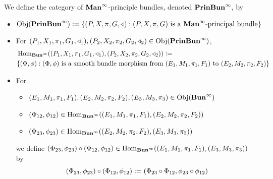\documentclass{book}
\begin{document}
\begin{ex}
	
\end{ex}






\begin{defn} 
	We define the category of $\operatorname*{\text{\textbf{Man}}^{\infty}}$-principle bundles, denoted $\operatorname*{\text{\textbf{PrinBun}}^{\infty}}$, by 
	\begin{itemize}
		\item $\operatorname{Obj}(\operatorname*{\text{\textbf{PrinBun}}^{\infty}}) \vcentcolon= \{(P, X, \pi, G, \triangleleft): (P, X, \pi, G) \text{ is a $\operatorname*{\text{\textbf{Man}}^{\infty}}$-principal bundle}\}$ 
		\item For $(P_1, X_1, \pi_1, G_1, \triangleleft_1), (P_2, X_2, \pi_2, G_2, \triangleleft_2) \in \operatorname{Obj}(\operatorname*{\text{\textbf{PrinBun}}^{\infty}})$, 
		\begin{align*}
			& \operatorname{Hom}_{\operatorname*{\text{\textbf{Bun}}^{\infty}}}((P_1, X_1, \pi_1, G_1, \triangleleft_1), (P_2, X_2, \pi_2, G_2, \triangleleft_2)) \vcentcolon= \\
			& \{(\Phi, \phi): (\Phi, \phi) \text{ is a smooth bundle morphism from $(E_1, M_1, \pi_1, F_1)$ to $(E_2, M_2, \pi_2, F_2)$} \}
		\end{align*}
		\item For 
		\begin{itemize}
			\item $(E_1, M_1, \pi_1, F_1), (E_2, M_2, \pi_2, F_2), (E_3, M_3, \pi_3) \in \operatorname{Obj}(\operatorname*{\text{\textbf{Bun}}^{\infty}})$ 
			\item $(\Phi_{12}, \phi_{12}) \in \operatorname{Hom}_{\operatorname*{\text{\textbf{Bun}}^{\infty}}}((E_1, M_1, \pi_1, F_1), (E_2, M_2, \pi_2, F_2))$
			\item $(\Phi_{23}, \phi_{23}) \in \operatorname{Hom}_{\operatorname*{\text{\textbf{Bun}}^{\infty}}}((E_2, M_2, \pi_2, F_2), (E_3, M_3, \pi_3))$ 
		\end{itemize}
		we define $(\Phi_{23}, \phi_{23}) \circ (\Phi_{12}, \phi_{12}) \in \operatorname{Hom}_{\operatorname*{\text{\textbf{Bun}}^{\infty}}}((E_1, M_1, \pi_1, F_1), (E_3, M_3, \pi_3))$ by 
		$$(\Phi_{23}, \phi_{23}) \circ (\Phi_{12}, \phi_{12}) \vcentcolon= (\Phi_{23} \circ \Phi_{12}, \phi_{23} \circ \phi_{12})$$
	\end{itemize}

\end{defn}
\end{document}

